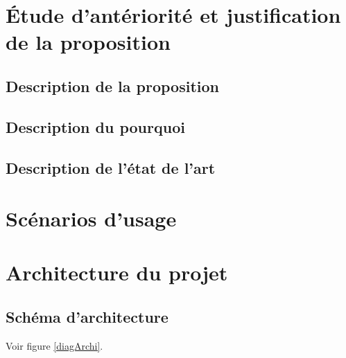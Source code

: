 \documentclass[a4paper,10pt]{report}
\theoremstyle{remark}
\begin{document}
\chapter{Étude d’antériorité et justification de la proposition}

	\section{Description de la proposition}
		
		
	\section{Description du pourquoi}
		
		
	\section{Description de l’état de l’art}
		


\chapter{Scénarios d’usage}

	

\chapter{Architecture du projet}

	\section{Schéma d’architecture}
		Voir figure \ref{diagArchi}.
\end{document}
